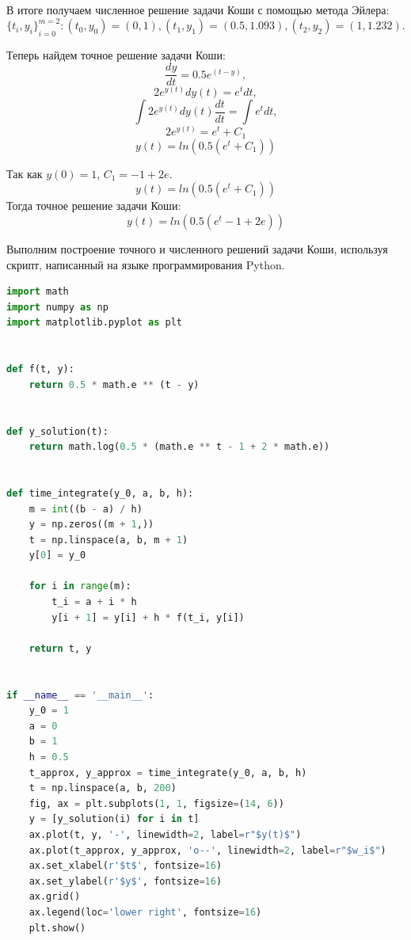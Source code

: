 \documentclass[12pt,a4paper]{article}
\begin{document}
В итоге получаем численное решение задачи Коши с помощью метода Эйлера:
\begin{equation}\label{3}
	{\{t_i,y_i\}}^{m=2}_{i=0}: (t_0,y_0) = (0,1), (t_1,y_1) = (0.5,1.093), (t_2,y_2) = (1,1.232).
\end{equation}

Теперь найдем точное решение задачи Коши:
\begin{equation}
	\frac{dy}{dt} = 0.5 e^{(t-y)},
\end{equation}
\begin{equation}
	2e^{y(t)} dy(t)  = e^t dt,
\end{equation}
\begin{equation}
	\int 2e^{y(t)} dy(t) \frac{dt}{dt}  = \int e^t dt,
\end{equation}
\begin{equation}
	2e^{y(t)} = e^t + C_1	
\end{equation}
\begin{equation}
	y(t) = ln(0.5(e^t + C_1))	
\end{equation}

Так как $y(0) = 1$, $C_1 = -1 + 2e$.
\begin{equation}
	y(t) = ln(0.5(e^t + C_1))	
\end{equation}
Тогда точное решение задачи Коши:
\begin{equation}
	y(t) = ln(0.5(e^t - 1 + 2e))	
\end{equation}

Выполним построение точного и численного решений задачи Коши, используя скрипт, написанный на языке программирования Python. 

\begin{lstlisting}[language=Python, caption={Построение графиков точного и численного решений задачи Коши.}]
import math
import numpy as np
import matplotlib.pyplot as plt


def f(t, y):
    return 0.5 * math.e ** (t - y)


def y_solution(t):
    return math.log(0.5 * (math.e ** t - 1 + 2 * math.e))


def time_integrate(y_0, a, b, h):
    m = int((b - a) / h)
    y = np.zeros((m + 1,))
    t = np.linspace(a, b, m + 1)
    y[0] = y_0

    for i in range(m):
        t_i = a + i * h
        y[i + 1] = y[i] + h * f(t_i, y[i])

    return t, y


if __name__ == '__main__':
    y_0 = 1
    a = 0
    b = 1
    h = 0.5
    t_approx, y_approx = time_integrate(y_0, a, b, h)
    t = np.linspace(a, b, 200)
    fig, ax = plt.subplots(1, 1, figsize=(14, 6))
    y = [y_solution(i) for i in t]
    ax.plot(t, y, '-', linewidth=2, label=r"$y(t)$")
    ax.plot(t_approx, y_approx, 'o--', linewidth=2, label=r"$w_i$")
    ax.set_xlabel(r'$t$', fontsize=16)
    ax.set_ylabel(r'$y$', fontsize=16)
    ax.grid()
    ax.legend(loc='lower right', fontsize=16)
    plt.show()

\end{lstlisting}
\end{document}
